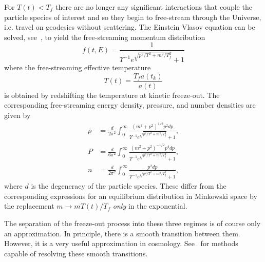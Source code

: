 \documentclass[universe,article,submit,moreauthors,pdftex,a4paper]{Definitions/mdpi}
\begin{document}
For $T(t)<T_f$ there are no longer any significant interactions that couple the particle species of interest and so they begin to free-stream through the Universe, i.e. travel on geodesics without scattering. The Einstein Vlasov equation can be solved, see~\cite{choquet2008general}, to yield the free-streaming momentum distribution
\begin{equation}\label{free_stream_dist}
f(t,E)=\frac{1}{\Upsilon^{-1}e^{\sqrt{p^2/T^2+m^2 /T_f^2}}+ 1}
\end{equation}
where the free-streaming effective temperature
\begin{equation}\label{T_freestream_dist}
T(t)=\frac{T_fa(t_k)}{a(t)}
\end{equation}
is obtained by redshifting the temperature at kinetic freeze-out. The corresponding free-streaming energy density, pressure, and number densities are given by
\begin{align}
\rho&=\frac{d}{2\pi^2}\!\int_0^\infty\!\!\!\frac{\left(m^2+p^2\right)^{1/2}p^2dp }{\Upsilon^{-1}e^{\sqrt{p^2/T^2+m^2/T_f^2}}+ 1},\label{freestream_rho}\\[0.2cm]
P&=\frac{d}{6\pi^2}\!\int_0^\infty\!\!\!\frac{\left(m^2+p^2\right)^{-1/2}p^4dp }{\Upsilon^{-1} e^{\sqrt{p^2/T^2+m^2/T_f^2}}+ 1},\label{freestream_P}\\[0.2cm]
n&=\frac{d}{2\pi^2}\!\int_0^\infty\!\!\!\frac{p^2dp }{\Upsilon^{-1}e^{\sqrt{p^2/T^2+m^2/T_f^2}}+ 1},
\label{num_density}
\end{align}
where $d$ is the degeneracy of the particle species. These differ from the corresponding expressions for an equilibrium distribution in Minkowski space by the replacement $m\rightarrow m T(t)/T_f$ {\em only} in the exponential. 

The separation of the freeze-out process into these three regimes is of course only an approximation. In principle, there is a smooth transition between them. However, it is a very useful approximation in cosmology. See~\cite{Mangano:2005cc,Birrell:2014gea} for methods capable of resolving these smooth transitions.
\end{document}
